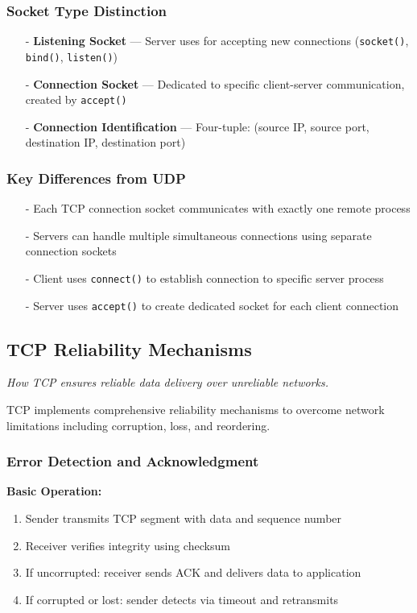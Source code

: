 \documentclass[../../compsys.tex]{subfiles}
\begin{document}
\subsubsection{Socket Type Distinction}
\begin{itemize}
  \item[-] \textbf{Listening Socket} — Server uses for accepting new connections (\texttt{socket()}, \texttt{bind()}, \texttt{listen()})
  \item[-] \textbf{Connection Socket} — Dedicated to specific client-server communication, created by \texttt{accept()}
  \item[-] \textbf{Connection Identification} — Four-tuple: (source IP, source port, destination IP, destination port)
\end{itemize}

\subsubsection{Key Differences from UDP}
\begin{itemize}
  \item[-] Each TCP connection socket communicates with exactly one remote process
  \item[-] Servers can handle multiple simultaneous connections using separate connection sockets
  \item[-] Client uses \texttt{connect()} to establish connection to specific server process
  \item[-] Server uses \texttt{accept()} to create dedicated socket for each client connection
\end{itemize}

\subsection{TCP Reliability Mechanisms}
\textit{How TCP ensures reliable data delivery over unreliable networks.}

TCP implements comprehensive reliability mechanisms to overcome network limitations including corruption, loss, and reordering.

\subsubsection{Error Detection and Acknowledgment}
\textbf{Basic Operation:}
\begin{enumerate}
  \item Sender transmits TCP segment with data and sequence number
  \item Receiver verifies integrity using checksum
  \item If uncorrupted: receiver sends ACK and delivers data to application
  \item If corrupted or lost: sender detects via timeout and retransmits
\end{enumerate}
\end{document}
